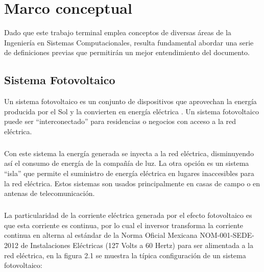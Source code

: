 
\chapter{Marco conceptual}\label{chapter2}

Dado que este trabajo terminal emplea conceptos de diversas áreas de la Ingeniería en Sistemas Computacionales, resulta fundamental abordar una serie de definiciones previas que permitirán un mejor entendimiento del documento.


\section{Sistema Fotovoltaico}
Un sistema fotovoltaico es un conjunto de dispositivos que aprovechan la energía producida por el Sol y la convierten en energía eléctrica \citep{MarcoTeorico1}. Un sistema fotovoltaico puede ser “interconectado” para residencias o negocios con acceso a la red eléctrica. 

\paragraph{}
Con este sistema la energía generada se inyecta a la red eléctrica, disminuyendo así el consumo de energía de la compañía de luz. La otra opción es un sistema “isla” que permite el suministro de energía eléctrica en lugares inaccesibles para la red eléctrica. Estos sistemas son usados principalmente en casas de campo o en antenas de telecomunicación.
\paragraph{}
La particularidad de la corriente eléctrica generada por el efecto fotovoltaico es que esta corriente es continua, por lo cual el inversor transforma la corriente continua en alterna al estándar de la Norma Oficial Mexicana NOM-001-SEDE-2012 de Instalaciones Eléctricas (127 Volts a 60 Hertz) \citep{NORMA-Electrica} para ser alimentada a la red eléctrica, en la figura 2.1 se muestra la típica configuración de un sistema fotovoltaico:

